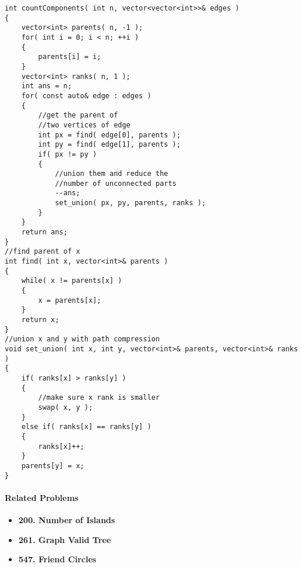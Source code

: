 \setcounter{lstlisting}{0}
\begin{lstlisting}[style=customc, caption={Union Find}]
int countComponents( int n, vector<vector<int>>& edges )
{
    vector<int> parents( n, -1 );
    for( int i = 0; i < n; ++i )
    {
        parents[i] = i;
    }
    vector<int> ranks( n, 1 );
    int ans = n;
    for( const auto& edge : edges )
    {
        //get the parent of
        //two vertices of edge
        int px = find( edge[0], parents );
        int py = find( edge[1], parents );
        if( px != py )
        {
            //union them and reduce the
            //number of unconnected parts
            --ans;
            set_union( px, py, parents, ranks );
        }
    }
    return ans;
}
//find parent of x
int find( int x, vector<int>& parents )
{
    while( x != parents[x] )
    {
        x = parents[x];
    }
    return x;
}
//union x and y with path compression
void set_union( int x, int y, vector<int>& parents, vector<int>& ranks )
{
    if( ranks[x] > ranks[y] )
    {
        //make sure x rank is smaller
        swap( x, y );
    }
    else if( ranks[x] == ranks[y] )
    {
        ranks[x]++;
    }
    parents[y] = x;
}
\end{lstlisting}

\paragraph{Related Problems}
\begin{itemize}
\item \textbf{200. Number of Islands}
\item \textbf{261. Graph Valid Tree}
\item \textbf{547. Friend Circles}
\end{itemize}